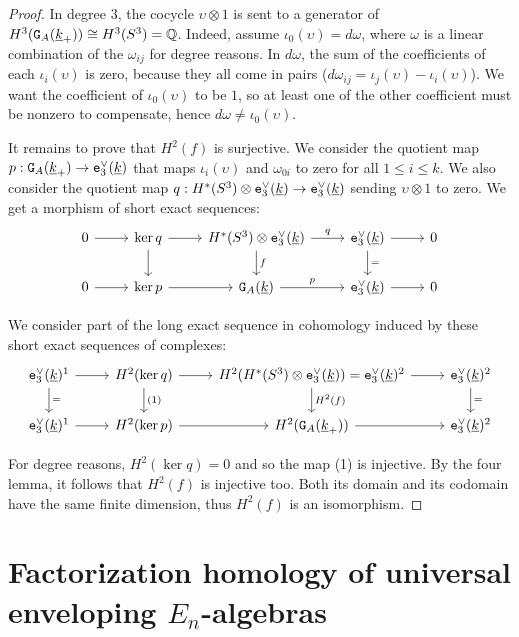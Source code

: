 \begin{proof}
  In degree $3$, the cocycle $\upsilon \otimes 1$ is sent to a generator of $H^{3}(\GG{A}(\underline{k}_{+})) \cong H^{3}(S^{3}) = \Q$.
  Indeed, assume $\iota_{0}(\upsilon) = d\omega$, where $\omega$ is a linear combination of the $\omega_{ij}$ for degree reasons.
  In $d\omega$, the sum of the coefficients of each $\iota_{i}(\upsilon)$ is zero, because they all come in pairs ($d\omega_{ij} = \iota_{j}(\upsilon) - \iota_{i}(\upsilon)$).
  We want the coefficient of $\iota_{0}(\upsilon)$ to be $1$, so at least one of the other coefficient must be nonzero to compensate, hence $d\omega \neq \iota_{0}(\upsilon)$.

  It remains to prove that $H^{2}(f)$ is surjective.
  We consider the quotient map $p : \GG{A}(\underline{k}_{+}) \to \enV[3](\underline{k})$ that maps $\iota_{i}(\upsilon)$ and $\omega_{0i}$ to zero for all $1 \leq i \leq k$.
  We also consider the quotient map $q : H^{*}(S^{3}) \otimes \enV[3](\underline{k}) \to \enV[3](\underline{k})$ sending $\upsilon \otimes 1$ to zero.
  We get a morphism of short exact sequences:
  \[ \begin{tikzcd}
      0 \rar & \ker q \rar \dar & H^{*}(S^{3}) \otimes \enV[3](\underline{k}) \rar{q} \dar{f} & \enV[3](\underline{k}) \dar{=} \rar & 0 \\
      0 \rar & \ker p \rar & \GG{A}(\underline{k}) \rar{p} & \enV[3](\underline{k}) \rar & 0
    \end{tikzcd} \]

  We consider part of the long exact sequence in cohomology induced by these short exact sequences of complexes:
  \[ \begin{tikzcd}
      \enV[3](\underline{k})^{1} \rar \dar{=} & H^{2}(\ker q) \rar \dar{(1)} & H^{2}(H^{*}(S^{3}) \otimes \enV[3](\underline{k})) = \enV[3](\underline{k})^{2} \rar \dar{H^{2}(f)} & \enV[3](\underline{k})^{2} \dar{=} \\
      \enV[3](\underline{k})^{1} \rar & H^{2}(\ker p) \rar & H^{2}(\GG{A}(\underline{k}_{+})) \rar & \enV[3](\underline{k})^{2}
    \end{tikzcd} \]

  For degree reasons, $H^{2}(\ker q) = 0$ and so the map (1) is injective.
  By the four lemma, it follows that $H^{2}(f)$ is injective too.
  Both its domain and its codomain have the same finite dimension, thus $H^{2}(f)$ is an isomorphism.
\end{proof}

\section{Factorization homology of universal enveloping \texorpdfstring{$E_{n}$}{E\_n}-algebras}
\label{cnf.sec.fact-homol-e_n}

